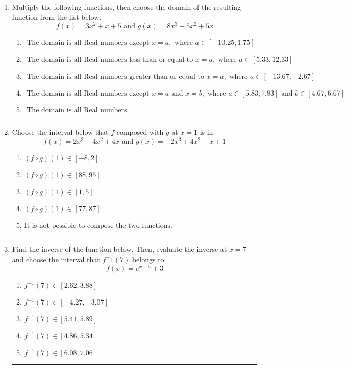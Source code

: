 \documentclass[14pt]{extbook}
\newcommand{\litem}[1]{\item#1\hspace*{-1cm}\rule{\textwidth}{0.4pt}}
\begin{document}
\begin{enumerate}
{\begin{enumerate}[label=\Alph*.]
\end{enumerate} }
\litem{
Multiply the following functions, then choose the domain of the resulting function from the list below.\[ f(x) = 3x^{2} +x + 5 \text{ and } g(x) = 8x^{3} +5 x^{2} +5 x \]\begin{enumerate}[label=\Alph*.]
\item \( \text{ The domain is all Real numbers except } x = a, \text{ where } a \in [-10.25, 1.75] \)
\item \( \text{ The domain is all Real numbers less than or equal to } x = a, \text{ where } a \in [5.33, 12.33] \)
\item \( \text{ The domain is all Real numbers greater than or equal to } x = a, \text{ where } a \in [-13.67, -2.67] \)
\item \( \text{ The domain is all Real numbers except } x = a \text{ and } x = b, \text{ where } a \in [5.83, 7.83] \text{ and } b \in [4.67, 6.67] \)
\item \( \text{ The domain is all Real numbers. } \)

\end{enumerate} }
\litem{
Choose the interval below that $f$ composed with $g$ at $x=1$ is in.\[ f(x) = 2x^{3} -4 x^{2} +4 x \text{ and } g(x) = -2x^{3} +4 x^{2} +x + 1 \]\begin{enumerate}[label=\Alph*.]
\item \( (f \circ g)(1) \in [-8, 2] \)
\item \( (f \circ g)(1) \in [88, 95] \)
\item \( (f \circ g)(1) \in [1, 5] \)
\item \( (f \circ g)(1) \in [77, 87] \)
\item \( \text{It is not possible to compose the two functions.} \)

\end{enumerate} }
\litem{
Find the inverse of the function below. Then, evaluate the inverse at $x = 7$ and choose the interval that $f^-1(7)$ belongs to.\[ f(x) = e^{x-5}+3 \]\begin{enumerate}[label=\Alph*.]
\item \( f^{-1}(7) \in [2.62, 3.88] \)
\item \( f^{-1}(7) \in [-4.27, -3.07] \)
\item \( f^{-1}(7) \in [5.41, 5.89] \)
\item \( f^{-1}(7) \in [4.86, 5.34] \)
\item \( f^{-1}(7) \in [6.08, 7.06] \)


\end{enumerate}}
\end{enumerate}
\end{document}
